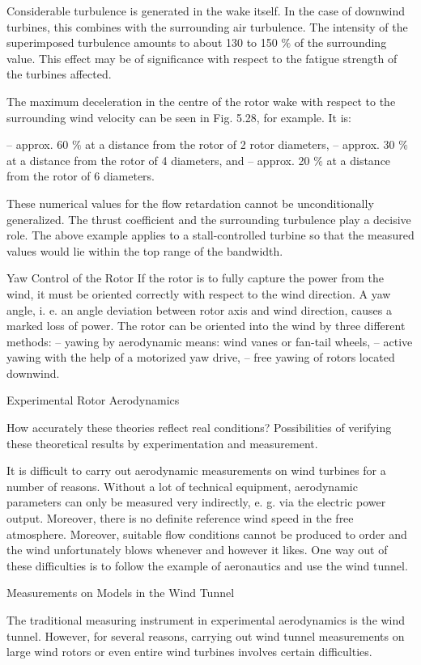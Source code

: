 Considerable turbulence is generated in the wake itself. In the case of downwind turbines, this combines with the surrounding air turbulence. The intensity of the superimposed turbulence amounts to about 130 to 150 $\%$ of the surrounding value. This effect may be of significance with respect to the fatigue strength of the turbines affected.

The maximum deceleration in the centre of the rotor wake with respect to the surrounding wind velocity can be seen in Fig. 5.28, for example. It is:

– approx. 60 $\%$ at a distance from the rotor of 2 rotor diameters,
– approx. 30 $\%$ at a distance from the rotor of 4 diameters, and
– approx. 20 $\%$ at a distance from the rotor of 6 diameters.

These numerical values for the flow retardation cannot be unconditionally generalized. The thrust coefficient and the surrounding turbulence play a decisive role. The above example applies to a stall-controlled turbine so that the measured values would lie within the top range of the bandwidth.

Yaw Control of the Rotor
If the rotor is to fully capture the power from the wind, it must be oriented correctly with respect to the wind direction. A yaw angle, i. e. an angle deviation between rotor axis and wind direction, causes a marked loss of power. The rotor can be oriented into the wind by three different methods:
– yawing by aerodynamic means: wind vanes or fan-tail wheels,
– active yawing with the help of a motorized yaw drive,
– free yawing of rotors located downwind.

Experimental Rotor Aerodynamics

How accurately these theories reflect real conditions?
Possibilities of verifying these theoretical results by experimentation and measurement.

It is difficult to carry out aerodynamic measurements on wind turbines for a number of reasons. Without a lot of technical equipment, aerodynamic parameters can only be measured very indirectly, e. g. via the electric power output. Moreover, there is no definite reference wind speed in the free atmosphere. Moreover, suitable flow conditions cannot be produced to order and the wind unfortunately blows whenever and however it likes. One way out of these difficulties is to follow the example of aeronautics and use the wind tunnel.

Measurements on Models in the Wind Tunnel

The traditional measuring instrument in experimental aerodynamics is the wind tunnel. However, for several reasons, carrying out wind tunnel measurements on large wind rotors or even entire wind turbines involves certain difficulties.

